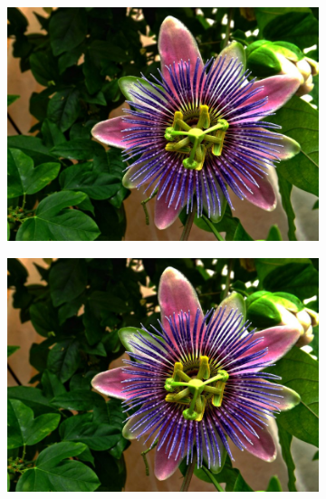 \documentclass{article}
\begin{document}
\begin{figure}[h]
\begin{subfigure}{.3\textwidth}
  \centering
  \includegraphics[width=0.97\linewidth]{_Figures/sample_2.jpg}
  \caption{}
  \label{fig:raw_hist_2}
\end{subfigure}%
\begin{subfigure}{.3\textwidth}
  \centering
  \includegraphics[width=0.97\linewidth]{_Figures/sample_2_normalization_average.png}
    \caption{}
      \label{fig:average_hist_2}
\end{subfigure}
\begin{subfigure}{.3\textwidth}
  \centering

\end{subfigure}
\end{figure}
\end{document}
